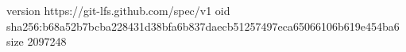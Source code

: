 version https://git-lfs.github.com/spec/v1
oid sha256:b68a52b7bcba228431d38bfa6b837daecb51257497eca65066106b619e454ba6
size 2097248
